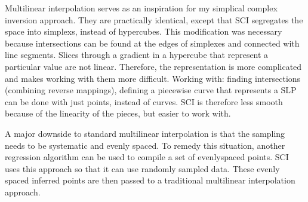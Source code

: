Multilinear interpolation serves as an inspiration for my simplical complex inversion approach.
They are practically identical, except that SCI segregates the space into simplexs, instead of hypercubes.
This modification was necessary because intersections can be found at the edges of simplexes and connected with line segments.
Slices through a gradient in a hypercube that represent a particular value are not linear.
Therefore, the representation is more complicated and makes working with them more difficult.
Working with: finding intersections (combining reverse mappings), defining a piecewise curve that represents a SLP can be done with just points, instead of curves.
SCI is therefore less smooth because of the linearity of the pieces, but easier to work with.

A major downside to standard multilinear interpolation is that the sampling needs to be systematic and evenly spaced.
To remedy this situation, another regression algorithm can be used to compile a set of evenlyspaced points.
SCI uses this approach so that it can use randomly sampled data.
These evenly spaced inferred points are then passed to a traditional multilinear interpolation approach.





